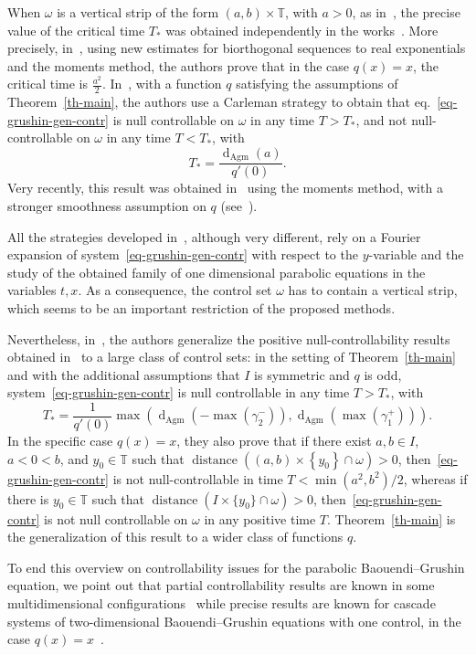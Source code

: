\documentclass[10pt]{amsart}
\theoremstyle{definition}\newtheorem{defi}[theo]{Definition}\newtheorem{rema}[theo]{Remark}\newtheorem{exam}[theo]{Example}\newtheorem{exem}[theo]{Example}\newtheorem{nota}[theo]{Notation}
\newcommand{\1}{\mathds 1}
\DeclareMathOperator{\distance}{distance}
\newcommand{\dagmon}{\mathop{\mathrm{d}}\nolimits_{\mathrm{Agm}}}
\newcommand{\T}{\mathbb{T}}
\newcommand{\g}{\gamma}
\renewcommand{\o}{\omega}
\begin{document}
When $\omega$ is a vertical strip of the form $(a,b) \times \T$, with $a>0$, as in~\cite{BCG14}, the precise value of the critical time $T_*$ was obtained independently in the works~\cite{ABM21,BDE20,LL22a}. More precisely, in~\cite{ABM21}, using new estimates for biorthogonal sequences to real exponentials and the moments method, the authors prove that in the case $q(x) = x$, the critical time is $\frac{a^2}{2}$. In~\cite{BDE20}, with a function $q$ satisfying the assumptions of Theorem~\ref{th-main}, the authors use a Carleman strategy to obtain that eq.~\eqref{eq-grushin-gen-contr} is null controllable on $\o$ in any time $T> T_*$, and not null-controllable on $\o$ in any time $T < T_*$, with
\[
T_* = \frac{\dagmon(a)}{q'(0)}.
\]
Very recently, this result was obtained in~\cite{LL22a} using the moments method, with a stronger smoothness assumption on $q$ (see~\cite[Remark~1.12 and Proposition~1.13]{LL22a}).

All the strategies developed in~\cite{ABM21,BCG14,BDE20,BMM15}, although very different, rely on a Fourier expansion of system~\eqref{eq-grushin-gen-contr} with respect to the $y$-variable and the study of the obtained family of one dimensional parabolic equations in the variables $t,x$. As a consequence, the control set $\omega$ has to contain a vertical strip, which seems to be an important restriction of the proposed methods.

Nevertheless, in~\cite{DK20}, the authors generalize the positive null-controllability results obtained in~\cite{BDE20} to a large class of control sets: in the setting of Theorem~\ref{th-main} and with the additional assumptions that $I$ is symmetric and $q$ is odd, system~\eqref{eq-grushin-gen-contr} is null controllable in any time $T>T_*$, with
\[
T_* = \dfrac1{q'(0)}\max\left(\dagmon(-\max(\g_2^-)),\dagmon(\max(\g_1^+))\right).
\]
In the specific case $q(x) = x$, they also prove that if there exist $a,b \in I$, $a < 0 <b$, and $y_0 \in \T$ such that $\distance((a,b) \times \left\lbrace y_0 \right\rbrace \cap \omega) > 0$, then~\eqref{eq-grushin-gen-contr} is not null-controllable in time $T< \min(a^2, b^2)/2$, whereas if there is $y_0 \in \T$ such that $\distance (I\times \lbrace y_0 \rbrace \cap \o) > 0$, then~\eqref{eq-grushin-gen-contr} is not null controllable on $\o$ in any positive time $T$. Theorem~\ref{th-main} is the generalization of this result to a wider class of functions $q$.

To end this overview on controllability issues for the parabolic Baouendi--Grushin equation, we point out that partial controllability results are known in some multidimensional configurations~\cite{BDE20} while precise results are known for cascade systems of two-dimensional Baouendi--Grushin equations with one control, in the case $q(x) = x$~\cite{ABM21}.
\end{document}
